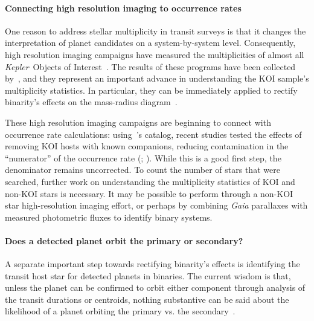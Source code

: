 \documentclass[12pt,modern]{aastex61}
\begin{document}
\paragraph{Connecting high resolution imaging to occurrence rates}
One reason to address stellar multiplicity in transit surveys is that
it changes the interpretation of planet candidates on a
system-by-system level.  Consequently, high resolution imaging
campaigns have measured the multiplicities of almost all {\it Kepler}\
Objects of Interest~\citep{
  howell_speckle_2011,adams_adaptive_2012,adams_adaptive_2013,horch_observations_2012,
  horch_most_2014,lillo-box_multiplicity_2012,lillo-box_high-resolution_2014,dressing_adaptive_2014,
  law_robotic_2014,cartier_revision_2015,everett_high-resolution_2015,gilliland_hubble_2015,
  wang_influence_2015,wang_influence_2015-1,baranec_robo-ao_2016,ziegler_robo-ao_2017}.
The results of these programs have been collected
by~\citet{furlan_kepler_2017}, and they represent an important advance
in understanding the KOI sample's multiplicity statistics.  In
particular, they can be immediately applied to rectify binarity's
effects on the mass-radius diagram~\citep{furlan_densities_2017}.

These high resolution imaging campaigns are beginning to connect with
occurrence rate calculations: using~\citet{furlan_kepler_2017}'s
catalog, recent studies tested the effects of removing KOI hosts with
known companions, reducing contamination in the ``numerator'' of the
occurrence rate (\citealt{fulton_california-_2017};
\citealt{petigura_CKS_2017}).  While this is a good first step, the
denominator remains uncorrected.  To count the number of stars that
were searched, further work on understanding the multiplicity
statistics of KOI and non-KOI stars is necessary. It may be possible
to perform through a non-KOI star high-resolution imaging effort, or
perhaps by combining {\it Gaia} parallaxes with measured photometric
fluxes to identify binary systems.

\paragraph{Does a detected planet orbit the primary or secondary?}
A separate important step towards rectifying binarity's effects is
identifying the transit host star for detected planets in binaries.
The current wisdom is that, unless the planet can be confirmed to
orbit either component through analysis of the transit durations or
centroids, nothing substantive can be said about the likelihood of a
planet orbiting the primary vs. the
secondary~\citep[\textit{e.g.},][]{ciardi_understanding_2015,ziegler_robo-ao_2017}.
\end{document}
